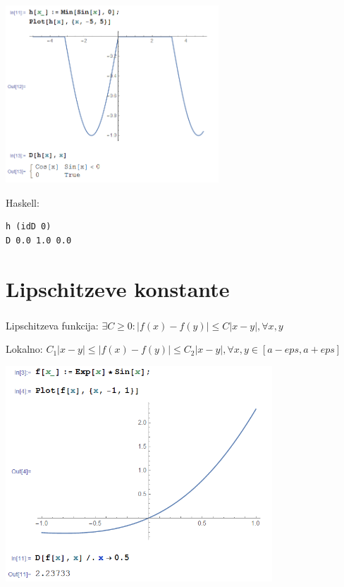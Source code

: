 \documentclass[9pt,table]{beamer}
\begin{document}
\begin{frame}[fragile]
\frametitle{}
\includegraphics[width=8cm]{graf4.png}

\pause
Haskell:
\begin{verbatim}
h (idD 0)
D 0.0 1.0 0.0
\end{verbatim}
\end{frame}


\section{Lipschitzeve konstante}

\begin{frame}
\frametitle{}\pause
Lipschitzeva funkcija: $\exists C\geq 0: |f(x)-f(y)|\leq C|x-y|, \forall x,y$ \pause

\vspace{10mm}
Lokalno: $C_1|x-y|\leq|f(x)-f(y)|\leq C_2|x-y|, \forall x,y \in [a-eps, a+eps]$
\end{frame}


\begin{frame}[fragile]
\includegraphics[width=10cm]{graf5.png}
\end{frame}
\end{document}

